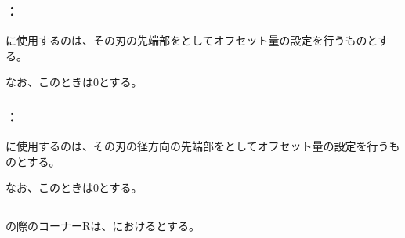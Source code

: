\subsubsection{\indexTLCEndFacecutMilling\nameTLCorrection：\nameEndFacecutMilling}
\EndFacecutMilling に使用する\indexTLFaceMill\nameFaceMill の\nameToolLength は、その刃の先端部を\ToolLength としてオフセット量の設定を行うものとする。

なお、このとき\TLCWearValue は0とする。

\subsubsection{\indexTDCEndFacecutMilling\nameTDCorrection：\nameEndFacecutMilling}
\EndFacecutMilling に使用する\indexTDFaceMill\nameFaceMill の\nameToolDiameter は、その刃の径方向の先端部を\ToolDiameter としてオフセット量の設定を行うものとする。

なお、このとき\TDCWearValue は0とする。


\subsection{\EndFacecutCornerR}
\nameEndFacecutMilling の際のコーナーRは、\nameEndFace における\nameIDCornerR とする。



\clearpage


